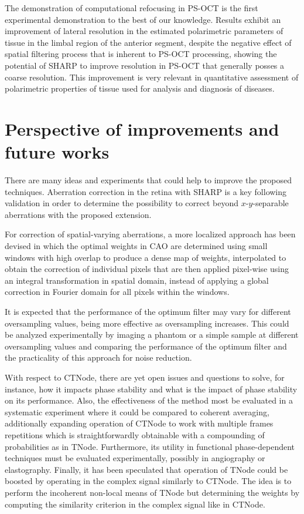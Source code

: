 The demonstration of computational refocusing in PS-OCT is the first experimental demonstration to the best of our knowledge. Results exhibit an improvement of lateral resolution in the estimated polarimetric parameters of tissue in the limbal region of the anterior segment, despite the negative effect of spatial filtering process that is inherent to PS-OCT processing, showing the potential of SHARP to improve resolution in PS-OCT that generally posses a coarse resolution. This improvement is very relevant in quantitative assessment of polarimetric properties of tissue used for analysis and diagnosis of diseases.

\newpage
\section{Perspective of improvements and future works}

There are many ideas and experiments that could help to improve the proposed techniques. Aberration correction in the retina with SHARP is a key following validation in order to determine the possibility to correct beyond $x$-$y$-separable aberrations with the proposed extension.

For correction of spatial-varying aberrations, a more localized approach has been devised in which the optimal weights in CAO are determined using small windows with high overlap to produce a dense map of weights, interpolated to obtain the correction of individual pixels that are then applied pixel-wise using an integral transformation in spatial domain, instead of applying a global correction in Fourier domain for all pixels within the windows.

It is expected that the performance of the optimum filter may vary for different oversampling values, being more effective as oversampling increases. This could be analyzed experimentally by imaging a phantom or a simple sample at different oversampling values and comparing the performance of the optimum filter and the practicality of this approach for noise reduction.

With respect to CTNode, there are yet open issues and questions to solve, for instance, how it impacts phase stability and what is the impact of phase stability on its performance. Also, the effectiveness of the method most be evaluated in a systematic experiment where it could be compared to coherent averaging, additionally expanding operation of CTNode to work with multiple frames repetitions which is straightforwardly obtainable with a compounding of probabilities as in TNode. Furthermore, its utility in functional phase-dependent techniques must be evaluated experimentally, possibly in angiography or elastography. Finally, it has been speculated that operation of TNode could be boosted by operating in the complex signal similarly to CTNode. The idea is to perform the incoherent non-local means of TNode but determining the weights by computing the similarity criterion in the complex signal like in CTNode.

